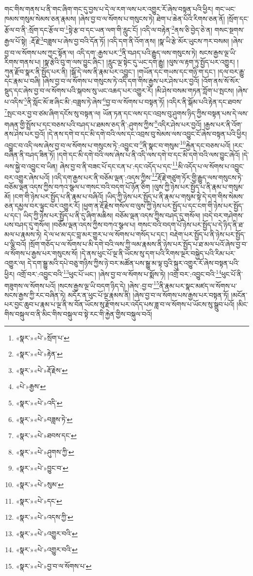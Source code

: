 གང་གིས་གནས་པ་ནི་གང་ཞིག་གང་དུ་བྱས་པ་དེ་ལ་རག་ལས་པར་འགྱུར་རོ་ཞེས་བསྟན་པའི་ཕྱིར། གང་ཡང་ཁམས་གསུམ་སེམས་ཅན་རྣམས། །ཞེས་བྱ་བ་ལ་སོགས་པ་གསུངས་ཏེ། ཐེག་པ་ཆེན་པོའི་རིགས་ཅན་ནོ། །སྲོག་དང་རྩོལ་བ་ནི་:སྲོག་དང་རྩོལ་བ་\footnote{«སྣར་»«པེ་»སྲོག་པ་}སྟེ་རྩ་བ་དང་ཡན་ལག་གི་རླུང་ངོ། །འདི་ལ་བརྟེན་\footnote{«སྣར་»«པེ་»རྟེན་}ནས་ཅི་བྱེད་ཅེ་ན། གསང་སྔགས་རྒྱལ་པོ་སྟེ། :རྡོ་རྗེ་\footnote{«སྣར་»«པེ་»རྡོ་རྗེས་}བཟླས་པ་ཞེས་བྱ་བའི་དོན་ཏོ། །འདི་དག་ནི་འོག་ནས། །སྣ་ཡི་རྩེ་མོར་ཡུངས་ཀར་བསམ། །ཞེས་བྱ་བ་ལ་སོགས་པས་ཀྱང་སྟོན་ལ། འདི་དག་:རྒྱས་པར་\footnote{«པེ་»རྒྱས་}ནི་བཤད་པའི་རྒྱུད་ལས་གསུངས་ཏེ། སངས་རྒྱས་ལྔ་ཡི་རིགས་གནས་པ། །སྣ་རྩེའི་བུ་ག་ལས་བྱུང་ཞིང་། །རླུང་ལྔ་སྟེང་དུ་ཡང་དག་རྒྱུ། །ལུས་ལ་རྟག་ཏུ་སྤྱོད་པར་འགྱུར། །ཀུན་རྫོབ་སྣར་ནི་སྤྱོད་པར་ནི། །སྒོ་དེ་ལས་ནི་རྣམ་པར་འབྱུང་། །གཡོན་དང་གཡས་དང་གཉི་ག་དང་། །དལ་བར་རྒྱུ་དང་རྣམ་པ་བཞི། །ཞེས་བྱ་བ་ལ་སོགས་པ་གསུངས་ཏེ་འདི་དག་གིས་རྒྱས་པར་ཤེས་པར་བྱའོ། །འོག་ནས་སོ་སོར་སྡུད་དང་ཞེས་བྱ་བ་ལ་སོགས་པའི་སྐབས་སུ་ཡང་འཆད་པར་འགྱུར་རོ། །མི་ཤེས་བསམ་གཏན་ཀློག་པ་སྤངས། །ཞེས་པ་འདིས་\footnote{«སྣར་»«པེ་»འདི་}ནི་སློང་མོ་ཟ་ཞིང་མི་:བཟླས་ཏེ་ཞེས་\footnote{«སྣར་»«པེ་»བཟླས་ཏེ་}བྱ་བ་ལ་སོགས་པ་བསྟན་ཏོ། །འདིར་ནི་སྒོམ་པའི་རྟེན་དང་ཐབས་\footnote{«སྣར་»«པེ་»ཐབས་དང་}སྤང་བར་བྱ་བ་ཙམ་ཞིག་དངོས་སུ་བསྟན་ལ། ཡོན་ཏན་དང་ལས་དང་འབྲས་བུ་ཤུགས་ཉིད་ཀྱིས་བསྟན་པས་དེ་ལས་གཞན་གྱི་སྤྲོས་པ་དང་བཅས་པའི་བཤད་པ་ཐམས་ཅད་ནི་:ཤུགས་ཀྱིས་\footnote{«སྣར་»«པེ་»ཤུགས་ཀྱི་}འདིར་ཤེས་པར་བྱའོ། །རྒྱས་པར་ནི་འོག་ནས་ཤེས་པར་བྱའོ། །དེ་ནས་དགེ་བ་དང་མི་དགེ་བའི་ལས་དང་འབྲས་བུ་སེམས་ལས་འབྱུང་ངོ་ཞེས་བསྟན་པའི་ཕྱིར། འབྱུང་བ་འདི་ལས་ཞེས་བྱ་བ་ལ་སོགས་པ་གསུངས་ཏེ་:འབྱུང་བ་\footnote{«སྣར་»«པེ་»བྱུང་བ་}ནི་སྣང་བ་གསུམ་\footnote{«སྣར་»«པེ་»སུམ་}རྐྱེན་དང་བཅས་པའོ། །རང་བཞིན་ནི་བཤད་ཟིན་ཏོ། །དགེ་དང་མི་དགེ་བའི་ལས་ཞེས་པ་ནི་འདི་ལས་དགེ་བ་དང་མི་དགེ་བའི་ལས་བྱུང་ཞེའོ། །དེ་ལས་སྐྱེ་བ་འབྱུང་བ་ཡིན། ཞེས་བྱ་བ་ནི་བཟང་པོ་དང་ངན་པ་:དང་འདོད་པ་དང་\footnote{«སྣར་»«པེ་»དང་}མི་འདོད་པ་ལ་སོགས་པ་འབྱུང་བར་འགྱུར་ཞེས་པའོ། །འདི་དག་རྒྱས་པར་ནི་བཅོམ་ལྡན་:འདས་ཀྱིས་\footnote{«སྣར་»«པེ་»འདས་ཀྱི་}རྡོ་རྗེ་གཙུག་ཏོར་གྱི་རྒྱུད་ལས་གསུངས་ཏེ་བཅོམ་ལྡན་འདས་ཀྱིས་བཀའ་སྩལ་པ་གསང་བའི་བདག་པོ་ཉོན་ཅིག །ལུས་ཀྱི་ཉེས་པར་སྤྱོད་པ་ནི་རྣམ་པ་གསུམ་མོ། །ངག་གི་ཉེས་པར་སྤྱོད་པ་ནི་རྣམ་པ་བཞིའོ། །ཡིད་ཀྱི་ཉེས་པར་སྤྱོད་པ་ནི་རྣམ་པ་གསུམ་སྟེ་དེ་དག་གིས་སེམས་ཅན་དམྱལ་བར་ལྟུང་བར་འགྱུར་རོ། །ཕྱག་ན་རྡོ་རྗེས་གསོལ་བ་ལུས་ཀྱི་ཉེས་པར་སྤྱོད་པ་དང་ངག་གི་ཉེས་པར་སྤྱོད་པ་དང་། ཡིད་ཀྱི་ཉེས་པར་སྤྱོད་པ་ནི་དུ་ཞིག་མཆིས། བཅོམ་ལྡན་འདས་ཀྱིས་བཤད་དུ་གསོལ། །བདེ་བར་གཤེགས་པས་བཤད་དུ་གསོལ། །བཅོམ་ལྡན་འདས་ཀྱིས་བཀའ་སྩལ་པ། གསང་བའི་བདག་པོ་ཉེས་པར་སྤྱོད་པ་དེ་ཉིད་ནི་ཐ་མལ་པ་རྣམས་ཏེ། དེ་ལ་ཕ་མ་དང་བླ་མར་གྱུར་པ་ལ་སོགས་པ་གསོད་པ་དང་། བརྡེག་པར་སྤྱོད་པ་ནི་ཉེས་པར་སྤྱོད་པ་ལྕི་བའོ། །སྲོག་གཅོད་པ་ལ་སོགས་པ་མི་དགེ་བའི་ལས་ཀྱི་ལམ་རྣམས་ནི་ཉེས་པར་སྤྱོད་པ་ཐ་མལ་པའོ་ཞེས་བྱ་བ་ལ་སོགས་པ་རྒྱས་པར་གསུངས་སོ། །དེ་ནས་ཕུང་པོ་ལྔ་ནི་ཡོངས་སུ་དག་པའི་རིགས་ལྔར་བསྐྱེད་པའི་རིམ་པར་འགྱུར་ལ། དེ་དག་སྒྱུ་མའི་དཔེ་བཅུ་གཉིས་ཀྱིས་ཉེ་བར་མཚོན་པས་སྒྱུ་མ་ལྟ་བུའི་སྐུར་འགྱུར་རོ་ཞེས་བསྟན་པའི་ཕྱིར། འགྲོ་བར་:འབྱུང་བའི་\footnote{«སྣར་»«པེ་»འགྱུར་བའི་}ཕུང་པོ་ཡང་། །ཞེས་བྱ་བ་ལ་སོགས་པ་སྨོས་ཏེ། །འགྲོ་བར་:འབྱུང་བའི་\footnote{«སྣར་»«པེ་»འགྱུར་བའི་}ཕུང་པོ་ནི་གཟུགས་ལ་སོགས་པའོ། །སངས་རྒྱས་ལྔ་ཡི་བདག་ཉིད་དེ། །ཞེས་:བྱ་བ་\footnote{«སྣར་»«པེ་»བྱ་བ་ལ་སོགས་པ་}ནི་རྣམ་པར་སྣང་མཛད་ལ་སོགས་པ་སངས་རྒྱས་ཀྱི་རང་བཞིན་ཏེ། མདོར་ན་ཕུང་པོ་ལྔ་རྣམས་ནི། །ཞེས་བྱ་བ་ལ་སོགས་པས་རྒྱས་པར་བསྟན་ཏོ། །མངོན་པར་བྱང་ཆུབ་པ་རྣམ་པ་ལྔ་ནི་ས་བོན་ཡོངས་སུ་རྫོགས་པར་འདོད་པས་ཟླ་བ་ལ་སོགས་པ་ཡོངས་སུ་སྒྲུབ་པའོ། །མིང་གིས་བསྐུལ་བ་ནི་མིང་གིས་བསྐུལ་བ་སྟེ་རང་གི་རྐྱེན་གྱིས་བསྐུལ་བའོ། 